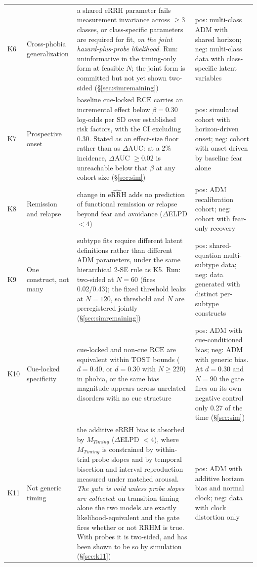 \documentclass[9pt,twocolumn]{article}
\newcommand{\eRRHhat}{\widehat{\mathrm{eRRH}}}
\newcommand{\RCE}{\mathrm{RCE}}
\begin{document}
\begin{table}[!t]
\begin{tabularx}{\textwidth}{p{}p{}X p{}}
K6 & Cross-phobia generalization & a shared eRRH parameter fails measurement invariance across $\ge3$ classes, or class-specific parameters are required for fit, \emph{on the joint hazard-plus-probe likelihood}. Run: uninformative in the timing-only form at feasible $N$; the joint form is committed but not yet shown two-sided (\S\ref{sec:simremaining}) & pos: multi-class ADM with shared horizon; neg: multi-class data with class-specific latent variables \\
K7 & Prospective onset & baseline cue-locked $\RCE$ carries an incremental effect below $\beta=0.30$ log-odds per SD over established risk factors, with the CI excluding $0.30$. Stated as an effect-size floor rather than as $\Delta$AUC: at a 2\% incidence, $\Delta$AUC $\ge0.02$ is unreachable below that $\beta$ at any cohort size (\S\ref{sec:sim}) & pos: simulated cohort with horizon-driven onset; neg: cohort with onset driven by baseline fear alone \\
K8 & Remission and relapse & change in $\eRRHhat$ adds no prediction of functional remission or relapse beyond fear and avoidance ($\Delta$ELPD $<4$) & pos: ADM recalibration cohort; neg: cohort with fear-only recovery \\
K9 & One construct, not many & subtype fits require different latent definitions rather than different ADM parameters, under the same hierarchical 2-SE rule as K5. Run: two-sided at $N=60$ (fires 0.02/0.43); the fixed threshold leaks at $N=120$, so threshold and $N$ are preregistered jointly (\S\ref{sec:simremaining}) & pos: shared-equation multi-subtype data; neg: data generated with distinct per-subtype constructs \\
K10 & Cue-locked specificity & cue-locked and non-cue $\RCE$ are equivalent within TOST bounds ($d=0.40$, or $d=0.30$ with $N\ge220$) in phobia, or the same bias magnitude appears across unrelated disorders with no cue structure & pos: ADM with cue-conditioned bias; neg: ADM with generic bias. At $d=0.30$ and $N=90$ the gate fires on its own negative control only 0.27 of the time (\S\ref{sec:sim}) \\
K11 & Not generic timing & the additive eRRH bias is absorbed by $M_{Timing}$ ($\Delta$ELPD $<4$), where $M_{Timing}$ is constrained by within-trial probe slopes and by temporal bisection and interval reproduction measured under matched arousal. \emph{The gate is void unless probe slopes are collected}: on transition timing alone the two models are exactly likelihood-equivalent and the gate fires whether or not RRHM is true. With probes it is two-sided, and has been shown to be so by simulation (\S\ref{sec:k11}) & pos: ADM with additive horizon bias and normal clock; neg: data with clock distortion only \\
\bottomrule
\end{tabularx}
\end{table}
\end{document}
